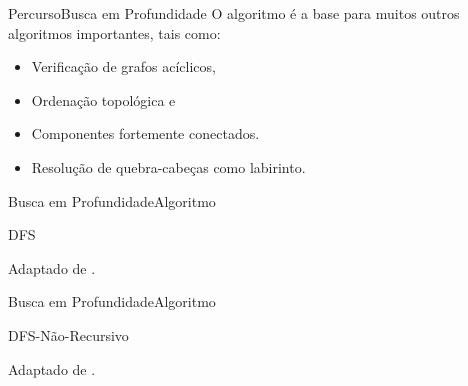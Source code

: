 \documentclass[aspectratio=169]{beamer}
\begin{document}

\begin{frame}{Percurso}{Busca em Profundidade}
O algoritmo é a base para muitos outros algoritmos importantes, tais como:
\begin{itemize}
\item Verificação de grafos acíclicos, 
\item Ordenação topológica e 
\item Componentes fortemente conectados.
\item Resolução de quebra-cabeças como labirinto.
\end{itemize} 
\end{frame}


\begin{frame}{Busca em Profundidade}{Algoritmo}
\begin{algorithm}[H]
\caption{DFS} 
\label{BuscaEmProfundidadeIdeia}
\end{algorithm}

\tiny{Adaptado de .}
\end{frame}


\begin{frame}{Busca em Profundidade}{Algoritmo}
\begin{algorithm}[H]
\caption{DFS-Não-Recursivo} 
\label{BuscaEmProfundidadeIdeiaNaoRecursivo}
\end{algorithm}

\tiny{Adaptado de .}
\end{frame}
\end{document}
